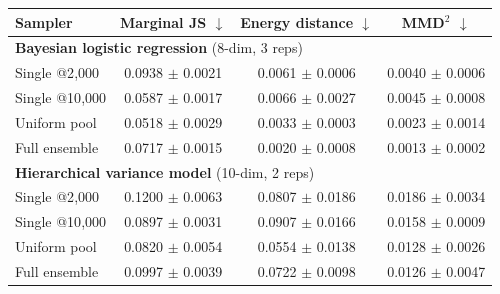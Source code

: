 \begin{tabular}{lccc}
\toprule
Sampler & Marginal JS $\downarrow$ & Energy distance $\downarrow$ & MMD$^2$ $\downarrow$ \\
\midrule
\multicolumn{4}{l}{\textbf{Bayesian logistic regression} (8-dim, 3 reps)} \\
\quad Single @2{,}000 & 0.0938 $\pm$ 0.0021 & 0.0061 $\pm$ 0.0006 & 0.0040 $\pm$ 0.0006 \\
\quad Single @10{,}000 & 0.0587 $\pm$ 0.0017 & 0.0066 $\pm$ 0.0027 & 0.0045 $\pm$ 0.0008 \\
\quad Uniform pool & 0.0518 $\pm$ 0.0029 & 0.0033 $\pm$ 0.0003 & 0.0023 $\pm$ 0.0014 \\
\quad Full ensemble & 0.0717 $\pm$ 0.0015 & 0.0020 $\pm$ 0.0008 & 0.0013 $\pm$ 0.0002 \\
\midrule
\multicolumn{4}{l}{\textbf{Hierarchical variance model} (10-dim, 2 reps)} \\
\quad Single @2{,}000 & 0.1200 $\pm$ 0.0063 & 0.0807 $\pm$ 0.0186 & 0.0186 $\pm$ 0.0034 \\
\quad Single @10{,}000 & 0.0897 $\pm$ 0.0031 & 0.0907 $\pm$ 0.0166 & 0.0158 $\pm$ 0.0009 \\
\quad Uniform pool & 0.0820 $\pm$ 0.0054 & 0.0554 $\pm$ 0.0138 & 0.0128 $\pm$ 0.0026 \\
\quad Full ensemble & 0.0997 $\pm$ 0.0039 & 0.0722 $\pm$ 0.0098 & 0.0126 $\pm$ 0.0047 \\
\bottomrule
\end{tabular}

